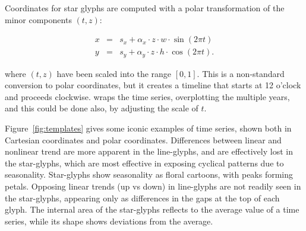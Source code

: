 \documentclass[oneside]{article}
\begin{document}

Coordinates for star glyphs are computed with a polar transformation of the minor components $(t, z)$:  

\begin{equation}
  \begin{array}{lll}
  x &=& s_x + \alpha_x \cdot z \cdot w \cdot \sin(2 \pi t) \\
  y &=& s_y + \alpha_y \cdot z \cdot h \cdot \cos(2 \pi t).
  \end{array}
  \label{coords.polar.eqn}
\end{equation}

\noindent where $(t, z)$ have been scaled into the range $[0, 1]$. This is a non-standard conversion to polar coordinates, but it creates a timeline that starts at 12 o'clock and proceeds clockwise. \citet{eden:2010} wraps the time series, overplotting the multiple years, and this could be done also, by adjusting the scale of $t$. 

%
% 
% 
%     
%   

Figure~\ref{fig:templates} gives some iconic examples of time series, shown both in Cartesian coordinates and polar coordinates. Differences between linear and nonlinear trend are more apparent in the line-glyphs, and are effectively lost in the star-glyphs, which are most effective in exposing cyclical patterns due to seasonality. Star-glyphs show seasonality as floral cartoons, with peaks forming petals. Opposing linear trends (up vs down) in line-glyphs are not readily seen in the star-glyphs, appearing only as differences in the gaps at the top of each glyph. The internal area of the star-glyphs reflects to the average value of a time series, while its shape shows deviations from the average.
\end{document}
